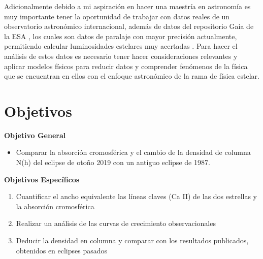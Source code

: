 \documentclass[11pt]{article}
\begin{document}

\noindent Adicionalmente debido a mi aspiración en hacer una maestría en astronomía es muy importante tener la oportunidad de trabajar con datos reales de un observatorio astronómico internacional, además de datos del repositorio Gaia de la ESA \cite{carrasco2006diseno}, los cuales son datos de paralaje con mayor precisión actualmente, permitiendo calcular luminosidades estelares muy acertadas \cite{fustes2014extraccion}. Para hacer el análisis de estos datos es necesario tener hacer consideraciones relevantes y aplicar modelos físicos para reducir datos y comprender fenómenos de la física que se encuentran en ellos con el enfoque astronómico de la rama de física estelar.

\section{Objetivos}

\textbf{Objetivo General}

\begin{itemize}
\item Comparar la absorción cromosférica y el cambio de la densidad de columna N(h) del eclipse de otoño 2019 con un antiguo eclipse de 1987.
\end{itemize}
\textbf{Objetivos Espec\'ificos}
\begin{enumerate}
    \item Cuantificar el ancho equivalente las líneas claves (Ca II) de las dos estrellas y la  absorción cromosférica

    \item Realizar un análisis de las curvas de crecimiento observacionales

    \item Deducir la densidad en columna y comparar con los resultados publicados, obtenidos en eclipses pasados
\end{enumerate}
\end{document}
